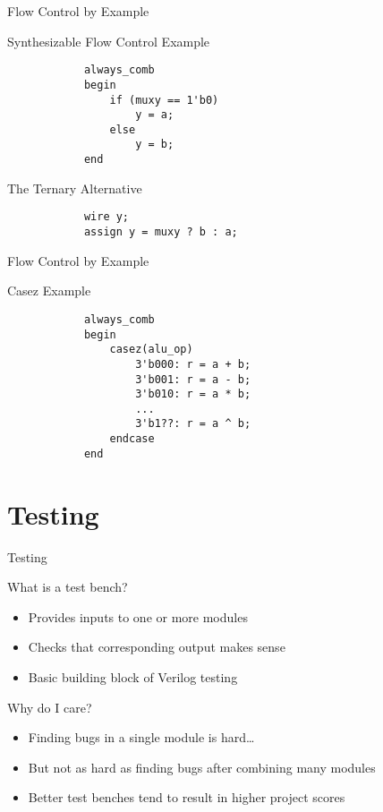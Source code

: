 \documentclass[table,dvipsnames,colorlinks=true]{beamer}
\begin{document}
\begin{frame}[fragile]{Flow Control by Example}
    \begin{block}{Synthesizable Flow Control Example}
        \begin{verbatim}
            always_comb
            begin
                if (muxy == 1'b0)
                    y = a;
                else
                    y = b;
            end
        \end{verbatim}
    \end{block}
    \begin{block}{The Ternary Alternative}
        \begin{verbatim}
            wire y;
            assign y = muxy ? b : a;
        \end{verbatim}
    \end{block}
\end{frame}

\begin{frame}[fragile]{Flow Control by Example}
    \begin{block}{Casez Example}
        \begin{verbatim}
            always_comb
            begin
                casez(alu_op)
                    3'b000: r = a + b;
                    3'b001: r = a - b;
                    3'b010: r = a * b;
                    ...
                    3'b1??: r = a ^ b;
                endcase
            end
        \end{verbatim}
    \end{block}
\end{frame}

\section{Testing}

\begin{frame}{Testing}
    \begin{block}{What is a test bench?}
        \begin{itemize}
            \item Provides inputs to one or more modules
            \item Checks that corresponding output makes sense
            \item Basic building block of Verilog testing
        \end{itemize}
    \end{block}
    \begin{block}{Why do I care?}
        \begin{itemize}
            \item Finding bugs in a single module is hard\dots
            \item But not as hard as finding bugs after combining many modules
            \item Better test benches tend to result in higher project scores
        \end{itemize}
    \end{block}
\end{frame}
\end{document}
